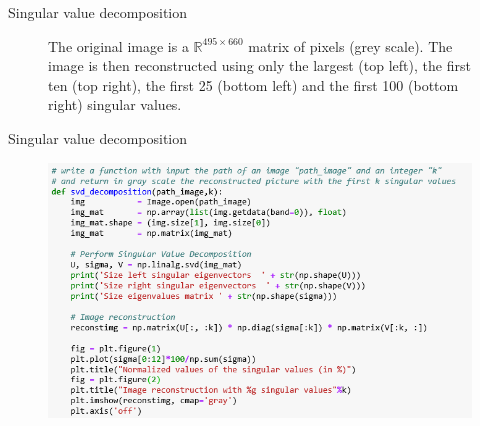 \documentclass[9pt]{beamer}
\def\rset{\ensuremath{\mathbb{R}}}
\begin{document}
\begin{frame}{Singular value decomposition}
\begin{figure}
\begin{center}
\end{center}
\caption{The original  image is a $\rset^{495\times 660}$ matrix  of pixels (grey scale).   The image is then reconstructed using only the largest (top left), the first ten (top right), the first 25 (bottom left) and the first 100 (bottom right) singular values.}
\end{figure}
\end{frame}

\begin{frame}{Singular value decomposition}
\begin{figure}
\begin{center}
\includegraphics[scale = .45]{./svd_python.png}\\

\vspace{.2cm}


\end{center}
\end{figure}
\end{frame}
\end{document}
